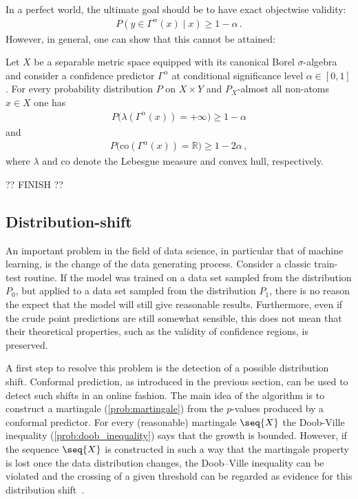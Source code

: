     In a perfect world, the ultimate goal should be to have exact objectwise validity:
    \begin{gather}
        P(y\in\Gamma^\alpha(x)\mid x)\geq 1-\alpha\,.
    \end{gather}
    However, in general, one can show that this cannot be attained:
    \begin{property}[No-go theorem]
        Let $X$ be a separable metric space equipped with its canonical Borel $\sigma$-algebra and consider a confidence predictor $\Gamma^\alpha$ at conditional significance level $\alpha\in[0,1]$. For every probability distribution $P$ on $X\times Y$ and $P_X$-almost all non-atoms $x\in X$ one has
        \begin{gather}
            P\bigl(\lambda(\Gamma^\alpha(x))=+\infty\bigr)\geq 1-\alpha
        \end{gather}
        and
        \begin{gather}
            P\bigl(\mathrm{co}(\Gamma^\alpha(x))=\mathbb{R}\bigr)\geq 1-2\alpha\,,
        \end{gather}
        where $\lambda$ and $\mathrm{co}$ denote the Lebesgue measure and convex hull, respectively.
    \end{property}

    ?? FINISH ??

\subsection{Distribution-shift}

    An important problem in the field of data science, in particular that of machine learning, is the change of the data generating process. Consider a classic train-test routine. If the model was trained on a data set sampled from the distribution $P_0$, but applied to a data set sampled from the distribution $P_1$, there is no reason the expect that the model will still give reasonable results. Furthermore, even if the crude point predictions are still somewhat sensible, this does not mean that their theoretical properties, such as the validity of confidence regions, is preserved.

    A first step to resolve this problem is the detection of a possible distribution shift. Conformal prediction, as introduced in the previous section, can be used to detect such shifts in an online fashion. The main idea of the algorithm is to construct a martingale (\cref{prob:martingale}) from the $p$-values produced by a conformal predictor. For every (reasonable) martingale $\seq{X}$ the Doob-Ville inequality (\cref{prob:doob_inequality}) says that the growth is bounded. However, if the sequence $\seq{X}$ is constructed in such a way that the martingale property is lost once the data distribution changes, the Doob--Ville inequality can be violated and the crossing of a given threshold can be regarded as evidence for this distribution shift~\citep{vovk_algorithmic_2005}.


